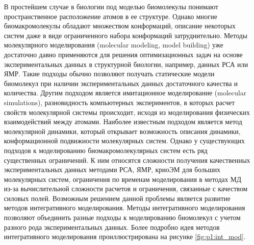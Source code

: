 В простейшем случае в биологии под моделью биомолекулы понимают пространственное расположение атомов в ее структуре. Однако многие биомакромолекулы обладают множеством конформаций, описание некоторых систем даже в виде ограниченного набора конформаций затруднительно.
Методы молекулярного моделирования (molecular modeling, model building) уже достаточно давно применяются для решения оптимизационных задач на основе экспериментальных данных в структурной биологии, например, данных РСА или ЯМР. Такие подходы обычно позволяют получать статические модели биомолекул при наличии экспериментальных данных достаточного качества и количества. Другим подходом является имитационное моделирование (molecular simulations), разновидность компьютерных экспериментов, в которых расчет свойств молекулярной системы происходит, исходя из моделирования физических взаимодействий между атомами. Наиболее известным подходом является метод молекулярной динамики, который открывает возможность описания динамики, конформационной подвижности молекулярных систем. Однако у существующих подходов к моделированию биомакромолекулярных систем есть ряд существенных ограничений. К ним относятся сложности получения качественных экспериментальных данных методами РСА, ЯМР, криоЭМ для больших молекулярных систем, ограничения по временам моделирования в методах МД из-за вычислительной сложности расчетов и ограничения, связанные с качеством силовых полей. Возможным решением данной проблемы является развитие методов интегративного моделирования. Методы интегративного моделирования позволяют объединить разные подходы к моделированию биомолекул с учетом разного рода экспериментальных данных. 
Более подробно идея методов интегративного моделирования проиллюстрирована на рисунке \ref{fig:p1:int_mod}.
